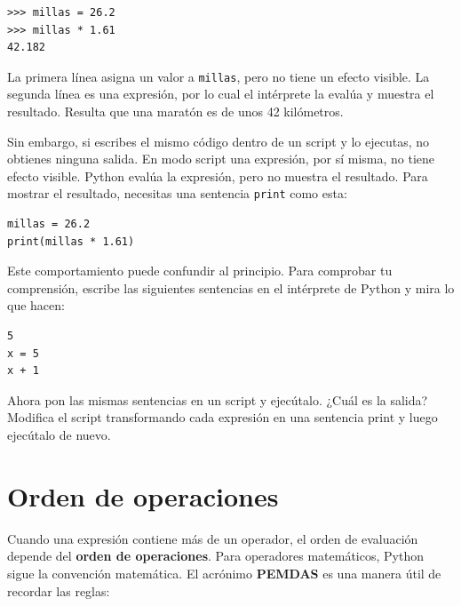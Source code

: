\documentclass[10pt]{book}
\begin{document}
\begin{verbatim}
>>> millas = 26.2
>>> millas * 1.61
42.182
\end{verbatim}

La primera línea asigna un valor a {\tt millas}, pero no tiene un efecto
visible.  La segunda línea es una expresión, por lo cual el
intérprete la evalúa y muestra el resultado.  Resulta que una
maratón es de unos 42 kilómetros.

Sin embargo, si escribes el mismo código dentro de un script y lo ejecutas, no obtienes
ninguna salida.
En modo script una expresión, por sí misma, no tiene
efecto visible.  Python evalúa la expresión, pero no
muestra el resultado.
Para mostrar el resultado, necesitas una sentencia {\tt print} como esta:

\begin{verbatim}
millas = 26.2
print(millas * 1.61)
\end{verbatim}

Este comportamiento puede confundir al principio.
Para comprobar tu comprensión, escribe las siguientes sentencias en el
intérprete de Python y mira lo que hacen:

\begin{verbatim}
5
x = 5
x + 1
\end{verbatim}

Ahora pon las mismas sentencias en un script y ejecútalo.  ¿Cuál
es la salida?  Modifica el script transformando cada
expresión en una sentencia print y luego ejecútalo de nuevo.

\section{Orden de operaciones}

Cuando una expresión contiene más de un operador, el orden de
evaluación depende del {\bf orden de operaciones}.  Para
operadores matemáticos, Python sigue la convención matemática.
El acrónimo {\bf PEMDAS} es una manera útil de
recordar las reglas:
\end{document}

